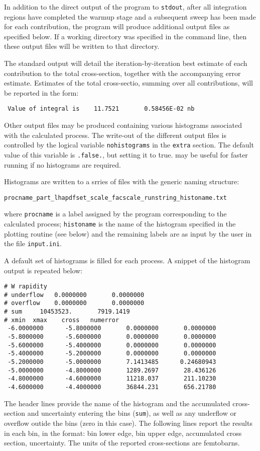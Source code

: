 \label{sec:output}

In addition to the direct output of the program to {\tt stdout}, after
all integration regions have completed the warmup stage and a subsequent
sweep has been made for each contribution, the program will
produce additional output files as specified below.
If a working directory was specified in the command line, then these
output files will be written to that directory.

The standard output will detail the iteration-by-iteration best estimate
of each contribution to the total cross-section, together with the
accompanying error estimate.  Estimates of the total cross-sectio, summing
over all contributions, will be reported in the form:
\begin{verbatim}
 Value of integral is    11.7521       0.58456E-02 nb 
\end{verbatim}

Other output files may be produced containing various histograms associated
with the calculated process. The write-out of the different output files
is controlled by the logical variable {\tt nohistograms} in the {\tt extra}
section.  The default value of this variable is {\tt .false.}, but setting it
to {\.true.} may be useful for faster running if no histograms are required.

Histograms are written to a srries of files with the generic naming structure:
\begin{verbatim}
procname_part_lhapdfset_scale_facscale_runstring_histoname.txt
\end{verbatim}
where {\tt procname} is a label assigned by the program corresponding to
the calculated process; {\tt histoname} is the name of the histogram specified
in the plotting routine (see below) and the remaining labels are as input
by the user in the file {\tt input.ini}.

A default set of histograms is filled for each process.  A snippet of
the histogram output is repeated below:
\begin{verbatim}
# W rapidity
# underflow	  0.0000000    	  0.0000000
# overflow	  0.0000000    	  0.0000000
# sum	  10453523.    	  7919.1419
# xmin	xmax	cross	numerror
 -6.0000000    	 -5.8000000    	  0.0000000    	  0.0000000
 -5.8000000    	 -5.6000000    	  0.0000000    	  0.0000000
 -5.6000000    	 -5.4000000    	  0.0000000    	  0.0000000
 -5.4000000    	 -5.2000000    	  0.0000000    	  0.0000000
 -5.2000000    	 -5.0000000    	  7.1413485    	 0.24680943
 -5.0000000    	 -4.8000000    	  1289.2697    	  28.436126
 -4.8000000    	 -4.6000000    	  11218.037    	  211.10230
 -4.6000000    	 -4.4000000    	  36844.231    	  656.21780
\end{verbatim}
The header lines provide the name of the histogram and the accumulated
cross-section and uncertainty entering the bins ({\tt sum}),
as well as any underflow or overflow outide the bins (zero in this case).
The following lines report the results in each bin, in the format:
bin lower edge, bin upper edge, accumulated cross section, uncertainty.
The units of the reported cross-sections are femtobarns.

